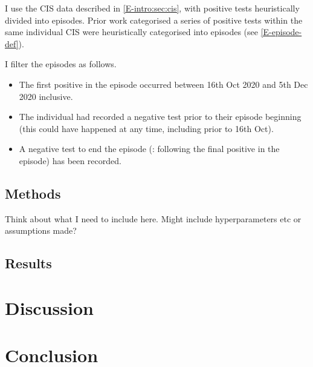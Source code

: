 \documentclass[thesis.tex]{subfiles}
\begin{document}
I use the CIS data described in \cref{E-intro:sec:cis}, with positive tests heuristically divided into episodes.
Prior work categorised a series of positive tests within the same individual CIS were heuristically categorised into episodes (see \cref{E-episode-def}).

I filter the episodes as follows.
\begin{itemize}
\item
  The first positive in the episode occurred between 16th Oct 2020 and
  5th Dec 2020 inclusive.
\item
  The individual had recorded a negative test prior to their episode
  beginning (this could have happened at any time, including prior to
  16th Oct).
\item
  A negative test to end the episode (\ie: following the final positive in the episode) has been recorded.
\end{itemize}


\subsection{Methods}

Think about what I need to include here.
Might include hyperparameters etc or assumptions made?

\subsection{Results}

\section{Discussion} \label{imperf-test:sec:discussion}

\section{Conclusion} \label{imperf-test:sec:conclusion}

\ifSubfilesClassLoaded{
  \listoftodos
}{}
\end{document}

